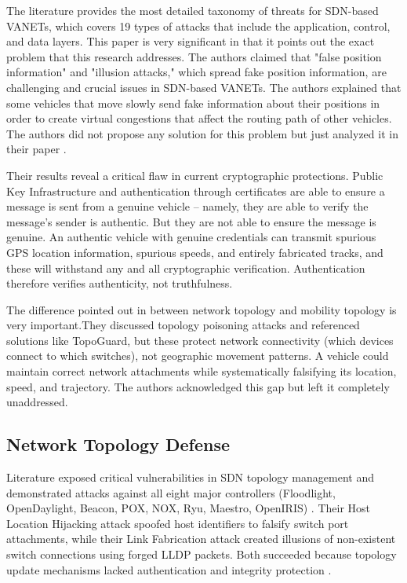 \documentclass[12pt, a4paper]{report}
\begin{document}
The literature provides the most detailed taxonomy of threats for SDN-based VANETs, which covers 19 types of attacks that include the application, control, and data layers. This paper is very significant in that it points out the exact problem that this research addresses. The authors claimed that "false position information" and "illusion attacks," which spread fake position information, are challenging and crucial issues in SDN-based VANETs. The authors explained that some vehicles that move slowly send fake information about their positions in order to create virtual congestions that affect the routing path of other vehicles. The authors did not propose any solution for this problem but just analyzed it in their paper \cite{arif2020}.

Their results reveal a critical flaw in current cryptographic protections. Public Key Infrastructure and authentication through certificates are able to ensure a message is sent from a genuine vehicle -- namely, they are able to verify the message's sender is authentic. But they are not able to ensure the message is genuine. An authentic vehicle with genuine credentials can transmit spurious GPS location information, spurious speeds, and entirely fabricated tracks, and these will withstand any and all cryptographic verification. Authentication therefore verifies authenticity, not truthfulness.

The difference pointed out in \cite{arif2020} between network topology and mobility topology is very important.They discussed topology poisoning attacks and referenced solutions like TopoGuard, but these protect network connectivity (which devices connect to which switches), not geographic movement patterns. A vehicle could maintain correct network attachments while systematically falsifying its location, speed, and trajectory. The authors acknowledged this gap but left it completely unaddressed.

\subsection{Network Topology Defense}
\label{subsec:network-topology-defense}

Literature exposed critical vulnerabilities in SDN topology management and demonstrated attacks against all eight major controllers (Floodlight, OpenDaylight, Beacon, POX, NOX, Ryu, Maestro, OpenIRIS) \cite{hong2015}. Their Host Location Hijacking attack spoofed host identifiers to falsify switch port attachments, while their Link Fabrication attack created illusions of non-existent switch connections using forged LLDP packets. Both succeeded because topology update mechanisms lacked authentication and integrity protection \cite{hong2015}.
\end{document}
